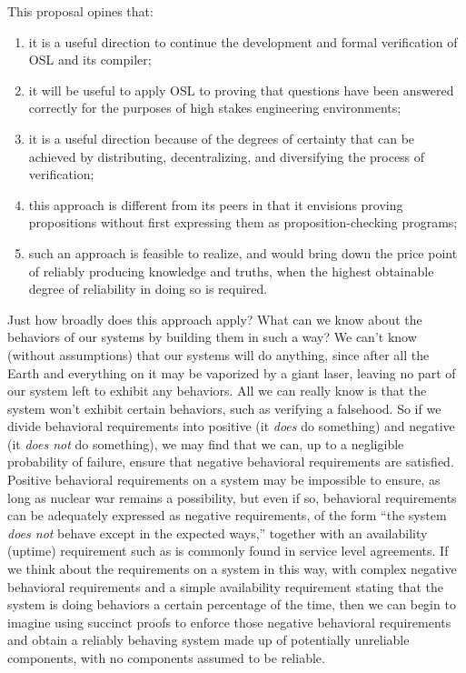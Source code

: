 \documentclass[11pt]{article}
\begin{document}
This proposal opines that:
\begin{enumerate}
	\item it is a useful direction to continue the development and formal verification
		of OSL and its compiler;
	\item it will be useful to apply OSL to proving that questions have been answered
		correctly for the purposes of high stakes engineering environments;
	\item it is a useful direction because of the degrees of certainty that can
		be achieved by distributing, decentralizing, and diversifying the process of
		verification;
	\item this approach is different from its peers in that it envisions proving propositions
		without first expressing them as proposition-checking programs;
	\item such an approach is feasible to realize, and would bring down the price point
		of reliably producing knowledge and truths, when the highest obtainable degree
		of reliability in doing so is required.
\end{enumerate}

Just how broadly does this approach apply? What can we know about the behaviors of our systems
by building them in such a way? We can't know (without assumptions) that our systems will do
anything, since after all the Earth and everything on it may be vaporized by a giant laser,
leaving no part of our system left to exhibit any behaviors. All we can really know is
that the system won't exhibit certain behaviors, such as verifying a falsehood. So if we
divide behavioral requirements into positive (it \emph{does}\/ do something) and negative
(it \emph{does not}\/ do something), we may find that we can, up to a negligible probability
of failure, ensure that negative behavioral requirements are satisfied. Positive behavioral
requirements on a system may be impossible to ensure, as long as nuclear war remains a possibility,
but even if so, behavioral requirements can be adequately expressed as negative requirements, of the form
``the system \emph{does not}\/ behave except in the expected ways,'' together with an
availability (uptime) requirement such as is commonly found in service level agreements.
If we think about the requirements on a system in this way, with complex negative behavioral
requirements and a simple availability requirement stating that the system is doing behaviors
a certain percentage of the time, then we can begin to imagine using succinct proofs to
enforce those negative behavioral requirements and obtain a reliably behaving system
made up of potentially unreliable components, with no components assumed to be reliable.
\end{document}
